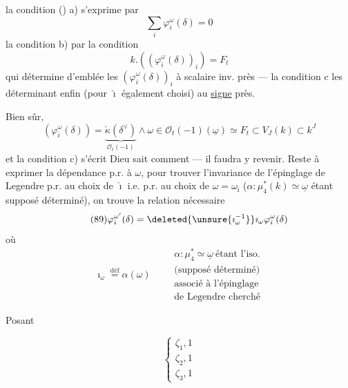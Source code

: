 la condition () a) s'exprime par
\[
\tag{86}
\sum_i\varphi_i^\omega(\delta)=0
\]
la condition b) par la condition
\[
\tag{87}
k.((\varphi_i^\omega(\delta))_i)=F_t
\]
qui détermine d'emblée les $(\varphi_i^\omega(\delta))_i$ à scalaire inv. près --- la condition c les déterminant enfin (pour $\hat\imath$ également choisi) au \uline{signe} près.

Bien sûr,  
\[
\tag{88}
(\varphi_i^\omega(\delta))=
\underbrace{\check\kappa(\delta^\vee)}_{\mathcal O_t(-1)}
\wedge\omega
\in\mathcal O_t(-1)(\underline\omega)\simeq F_t\subset V_J(k)\subset k^J
\]
et la condition c) s'écrit Dieu sait comment --- il faudra  y revenir. Reste à exprimer la dépendance p.r. à $\omega$, pour  trouver l'invariance de l'épinglage de Legendre p.r. au choix de $\hat\imath$ i.e. p.r. au choix de $\omega=\omega_{\hat\imath}$ ($\alpha:\mu_4^*(k)\simeq\underline\omega$ étant supposé déterminé), on trouve la relation nécessaire
\[
\tag{89}
\varphi_i^{\omega'}(\delta)=\deleted{\unsure{\imath_\omega^{-1}}}\imath_\omega\varphi_i^\omega(\delta)
\]
où
\[
\imath_\omega\overset{\text{déf}}=\alpha(\omega)
\qquad
\begin{gathered}
\alpha:\mu_4^*\simeq\underline\omega\ \text{étant l'iso.}\\
\text{(supposé déterminé)}\\
\text{associé à l'épinglage}\\
\text{de Legendre cherché}
\end{gathered}
\]

Posant


\[
\left\{\begin{array}{l}\zeta_1,1\\\zeta_2,1\\\zeta_3,1\end{array}\right.
\]


